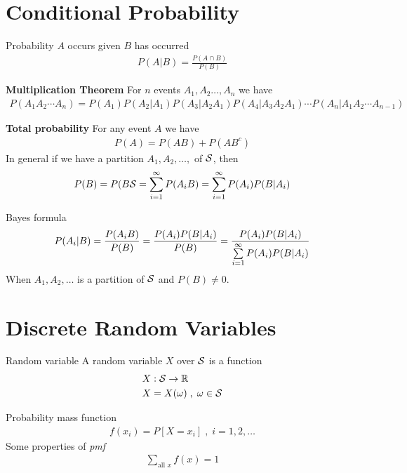 \documentclass[16pt,a4paper]{article}
\begin{document}
\newpage
\section{Conditional Probability}
\begin{defn}{Probability $A$ occurs given $B$ has occurred}
    \begin{align*}
        P(A\vert B) = \frac{P(A\cap B)}{P(B)}
    \end{align*}
\end{defn}

\begin{thm}{\textbf{Multiplication Theorem}}
    For $n$ events $A_1, A_2 \ldots, A_n$ we have 
    \begin{align*}
        P(A_1A_2\cdots A_n) = P(A_1)P(A_2\vert A_1)P(A_3\vert A_2A_1)P(A_4\vert A_3A_2A_1)\cdots P(A_n\vert A_1A_2\cdots A_{n-1})
    \end{align*}
\end{thm}

\begin{thm}{\textbf{Total probability}}
    For any event $A$ we have 
    \begin{align*}
        P(A) = P(AB) + P(AB^c)
    \end{align*}
    In general if we have a partition $A_1, A_2, \ldots,$ of ${\cal S}$, then 
    \begin{align*}
        P(B) = P(B{\cal S} = \sum\limits_{i=1}^{\infty}P(A_iB) = \sum\limits_{i=1}^{\infty}P(A_i)P(B\vert A_i)
    \end{align*}
\end{thm}

\begin{thm}{Bayes formula}
    \begin{align*}
        P(A_i\vert B) = \frac{P(A_iB)}{P(B)} = \frac{P(A_i)P(B\vert A_i)}{P(B)} = \frac{P(A_i)P(B\vert A_i)}{\sum\limits_{i=1}^{\infty}P(A_i)P(B\vert A_i)}
    \end{align*}
    When $A_1, A_2, \ldots$ is a partition of ${\cal S}$ and $P(B) \neq 0$. 
\end{thm}
\newpage
\section{Discrete Random Variables}
\begin{defn}{Random variable}
    A random variable $X$ over ${\cal S}$ is a function 
    \begin{align*}
        &X: {\cal S}\to \mathbb{R}\\
        &X = X(\omega) \;,\; \omega \in {\cal S}
    \end{align*}
\end{defn}
\begin{defn}{Probability mass function}
    \begin{align*}
        f(x_i) = P[X=x_i] \;,\; i =  1,2,\ldots
    \end{align*}
    Some properties of \textit{pmf}
    \begin{align*}
        \sum_{\text{all }x} f(x) = 1
    \end{align*}
\end{defn}
\end{document}
